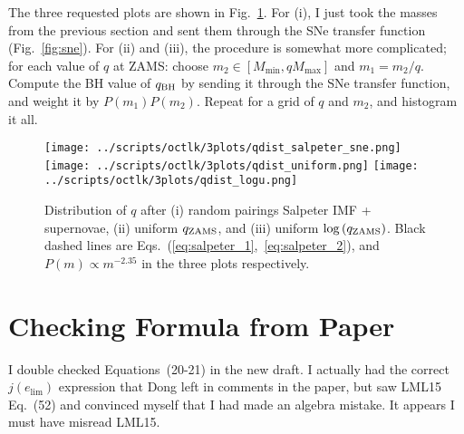 \documentclass[11pt,
        usenames, %
        dvipsnames %
    ]{article}
\newcommand*{\p}[1]{\left(#1\right)}
\begin{document}
The three requested plots are shown in Fig.~\ref{fig:2}. For (i), I just took
the masses from the previous section and sent them through the SNe transfer
function (Fig.~\ref{fig:sne}). For (ii) and (iii), the procedure is somewhat
more complicated; for each value of $q$ at ZAMS\@: choose $m_2 \in [M_{\min},
qM_{\max}]$ and $m_1 = m_2 / q$. Compute the BH value of $q_{\rm BH}$ by sending
it through the SNe transfer function, and weight it by $P(m_1)P(m_2)$. Repeat
for a grid of $q$ and $m_2$, and histogram it all.
\begin{figure}
    \centering
    \texttt{[image: ../scripts/octlk/3plots/qdist\_salpeter\_sne.png]}
    \texttt{[image: ../scripts/octlk/3plots/qdist\_uniform.png]}
    \texttt{[image: ../scripts/octlk/3plots/qdist\_logu.png]}
    \caption{Distribution of $q$ after (i) random pairings Salpeter IMF +
    supernovae, (ii) uniform $q_{\rm ZAMS}$, and (iii) uniform $\log\p{q_{\rm
    ZAMS}}$. Black dashed lines are
    Eqs.~(\ref{eq:salpeter_1},~\ref{eq:salpeter_2}), and $P(m) \propto
    m^{-2.35}$ in the three plots respectively. }\label{fig:2}
\end{figure}

\section{Checking Formula from Paper}

I double checked Equations~(20-21) in the new draft. I actually had the correct
$j(e_{\lim})$ expression that Dong left in comments in the paper, but saw LML15
Eq.~(52) and convinced myself that I had made an algebra mistake. It appears I
must have misread LML15.
\end{document}
